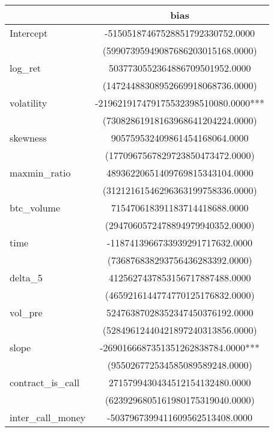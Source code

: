 \begin{tabular}{lc}
\hline
                      &                 bias                  \\
\midrule
\midrule
Intercept             & -51505187467528851792330752.0000      \\
                      & (59907395949087686203015168.0000)     \\
log\_ret              & 5037730552364886709501952.0000        \\
                      & (14724488308952669918068736.0000)     \\
volatility            & -219621917479175532398510080.0000***  \\
                      & (73082861918163968641204224.0000)     \\
skewness              & 905759532409861454168064.0000         \\
                      & (1770967567829723850473472.0000)      \\
maxmin\_ratio         & 48936220651409769815343104.0000       \\
                      & (31212161546296363199758336.0000)     \\
btc\_volume           & 715470618391183714418688.0000         \\
                      & (2947060572478894979940352.0000)      \\
time                  & -1187413966733939291717632.0000       \\
                      & (736876838293756436283392.0000)       \\
delta\_5              & 4125627437853156717887488.0000        \\
                      & (4659216144774770125176832.0000)      \\
vol\_pre              & 52476387028352347450376192.0000       \\
                      & (52849612440421897240313856.0000)     \\
slope                 & -2690166687351351262838784.0000***    \\
                      & (955026772534585089589248.0000)       \\
contract\_is\_call    & 2715799430434512154132480.0000        \\
                      & (6239296805161980175319040.0000)      \\
inter\_call\_money    & -5037967399411609562513408.0000       \\

\end{tabular}
